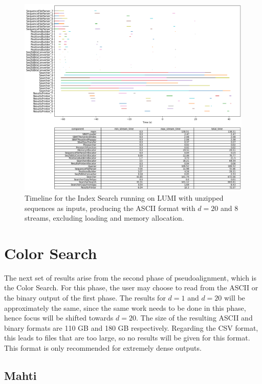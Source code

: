 \begin{figure}[t]
  \centering
  \includegraphics[width=\textwidth]{images/LumiIndexUnzippedD20S8ASCII.png}
  \caption{Timeline for the Index Search running on LUMI with unzipped sequences as inputs, producing the ASCII format with $d=20$ and 8 streams, excluding loading and memory allocation.}\label{fig:LumiIndexUnzippedD20S8ASCII}
\end{figure}

\section{Color Search}

The next set of results arise from the second phase of pseudoalignment, which is the Color Search.
For this phase, the user may choose to read from the ASCII or the binary output of the first phase.
The results for $d=1$ and $d=20$ will be approximately the same, since the same work needs to be done in this phase, hence focus will be shifted towards $d=20$.
The size of the resulting ASCII and binary formats are 110 GB and 180 GB respectively.
Regarding the CSV format, this leads to files that are too large, so no results will be given for this format.
This format is only recommended for extremely dense outputs.

\subsection{Mahti}

